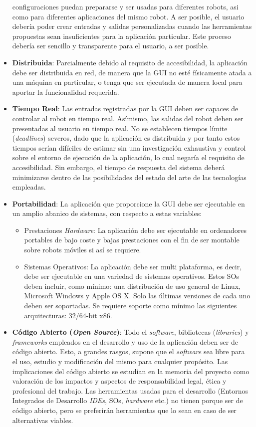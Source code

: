 \begin{itemize}
	configuraciones puedan prepararse y ser usadas para diferentes robots, asi como para diferentes aplicaciones del mismo 
	robot. A ser posible, el usuario debería poder crear entradas y salidas personalizadas cuando las herramientas propuestas 
	sean insuficientes para la aplicación particular. Este proceso debería ser sencillo y transparente para el usuario, a ser 
	posible.
	\item \textbf{Distribuida}: Parcialmente debido al requisito de accesibilidad, la aplicación debe ser distribuida en red, de 
	manera que la GUI no esté físicamente atada a una máquina en particular, o tenga que ser ejecutada de manera local para 
	aportar la funcionalidad requerida.
	\item \textbf{Tiempo Real}: Las entradas registradas por la GUI deben ser capaces de controlar al robot en tiempo real. 
	Asímismo, las salidas del robot deben ser presentadas al usuario en tiempo real. No se establecen tiempos límite 
	(\textit{deadlines}) severos, dado que la aplicación es distribuida y por tanto estos tiempos serían difíciles de estimar sin 
	una investigación exhaustiva y control sobre el entorno de ejecución de la aplicación, lo cual negaría el requisito de 
	accesibilidad. Sin embargo, el tiempo de respuesta del sistema deberá minimizarse dentro de las posibilidades del estado del 
	arte de las tecnologías empleadas.
	\item \textbf{Portabilidad}: La aplicación que proporcione la GUI debe ser ejecutable en un amplio abanico de sistemas, con 
	respecto a estas variables:
		\begin{itemize}
			\item Prestaciones \textit{Hardware}: La aplicación debe ser ejecutable en ordenadores portables de bajo coste y 
			bajas prestaciones con el fin de ser montable sobre robots móviles si así se requiere.
			\item Sistemas Operativos: La aplicación debe ser multi plataforma, es decir, debe ser ejecutable en una variedad de 
			sistemas operativos. Estos SOs deben incluir, como mínimo: una distribución de uso general de Linux, Microsoft 
			Windows y Apple OS X. Solo las últimas versiones de cada uno deben ser soportadas. Se requiere soporte como mínimo 
			las siguientes arquitecturas: 32/64-bit x86.\\
		\end{itemize}
	\item \textbf{Código Abierto (\textit{Open Source})}: Todo el \textit{software}, bibliotecas (\textit{libraries}) y 
	\textit{frameworks} empleados en el desarrollo y uso de la aplicación deben ser de código abierto. Esto, a grandes rasgos, 
	supone que el \textit{software} sea libre para el uso, estudio y modificación del mismo para cualquier propósito. Las 
	implicaciones del código abierto se estudian en la memoria del proyecto como valoración de los impactos y aspectos de 
	responsabilidad legal, ética y profesional del trabajo. Las herramientas usadas para el desarrollo (Entornos Integrados de 
	Desarrollo \textit{IDEs}, SOs, \textit{hardware} etc.) no tienen porque ser de código abierto, pero se preferirán 
	herramientas que lo sean en caso de ser alternativas viables.\\
\end{itemize}
